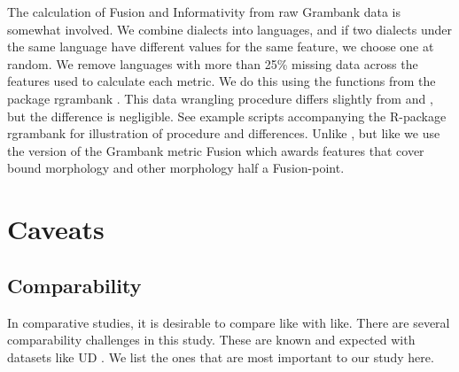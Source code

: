 \documentclass[USenglish]{article}
\begin{document}
The calculation of Fusion and Informativity from raw Grambank data is somewhat involved.
We combine dialects into languages, and if two dialects under the same language have different values for the same feature, we choose one at random. 
We remove languages with more than 25\% missing data across the features used to calculate each metric. 
We do this using the functions from the package rgrambank \citep{R-rgrambank}. 
This data wrangling procedure differs slightly from \citet{grambank_release} and \citet{shcherbakova2023societies}, but the difference is negligible. 
See example scripts accompanying the R-package rgrambank for illustration of procedure and differences.
Unlike \cite{shcherbakova2023societies}, but like \cite{grambank_release} we use the version of the Grambank metric Fusion which awards features that cover bound morphology and other morphology half a Fusion-point.

\FloatBarrier

\section{Caveats}
\label{sec:caveats}

\subsection{Comparability}
\label{caveat_comparability}
In comparative studies, it is desirable to compare like with like. There are several comparability challenges in this study. These are known and expected with datasets like UD \citep{UD_2.14}. We list the ones that are most important to our study here. 
\end{document}
